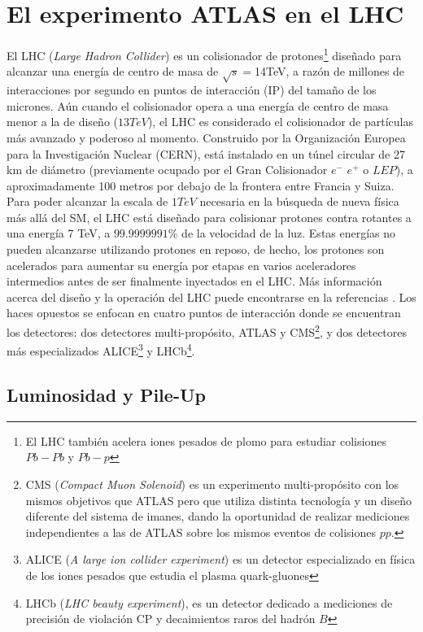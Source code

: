 \chapter{El experimento ATLAS en el LHC} \label{TheExperiment}

El LHC (\emph{Large Hadron Collider}) es un colisionador de protones\footnote{El LHC también acelera iones pesados de plomo para estudiar colisiones $Pb-Pb$ y $Pb-p$} diseñado para alcanzar una energía de centro de masa de $\sqrt{s}=$14TeV, a razón de millones de interacciones por segundo en puntos de interacción (IP) del tamaño de los micrones. Aún cuando el colisionador opera a una energía de centro de masa menor a la de diseño ($13TeV$), el LHC es considerado el colisionador de partículas más avanzado y poderoso al momento. Construido por la Organización Europea para la Investigación Nuclear (CERN), está instalado en un túnel circular de 27 km de diámetro (previamente ocupado por el Gran Colisionador $e^-$ $e^+$ o $LEP$), a aproximadamente 100 metros por debajo de la frontera entre Francia y Suiza.
Para poder alcanzar la escala de $1TeV$ necesaria en la búsqueda de nueva física más allá del SM, el LHC está diseñado para  colisionar protones contra rotantes a una energía 7 TeV, a $99.9999991\%$ de la velocidad de la luz. Estas energías no pueden alcanzarse utilizando protones en reposo, de hecho, los protones son acelerados para aumentar su energía por etapas en varios aceleradores intermedios antes de ser finalmente inyectados en el LHC. Más información acerca del diseño y la operación del LHC puede encontrarse en la referencias \cite{LHCMachine}\cite{LHCReport}. Los haces opuestos se enfocan en cuatro puntos de interacción donde se encuentran los detectores: dos detectores multi-propósito, ATLAS\cite{ATLAS} y CMS\footnote{CMS (\emph{Compact Muon Solenoid}) es un experimento multi-propósito con los mismos objetivos que ATLAS pero que utiliza distinta tecnología y un diseño diferente del sistema de imanes, dando la oportunidad de realizar mediciones independientes a las de ATLAS sobre los mismos eventos de colisiones $pp$.}\cite{CMS}, y dos detectores más especializados ALICE\footnote{ALICE (\emph{A large ion collider experiment}) es un detector especializado en física de los iones pesados que estudia el plasma quark-gluones}\cite{ALICE} y LHCb\footnote{LHCb (\emph{LHC beauty experiment}), es un detector dedicado a mediciones de precisión de violación CP y decaimientos raros del hadrón $B$}\cite{LHCb}.\\ 

\section{Luminosidad y Pile-Up}


